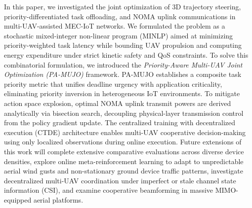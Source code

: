 \documentclass[journal]{IEEEtran}
\begin{document}
In this paper, we investigated the joint optimization of 3D trajectory steering, priority-differentiated task offloading, and NOMA uplink communications in multi-UAV-assisted MEC-IoT networks. We formulated the problem as a stochastic mixed-integer non-linear program (MINLP) aimed at minimizing priority-weighted task latency while bounding UAV propulsion and computing energy expenditure under strict kinetic safety and QoS constraints. To solve this combinatorial formulation, we introduced the \textit{Priority-Aware Multi-UAV Joint Optimization (PA-MUJO)} framework. PA-MUJO establishes a composite task priority metric that unifies deadline urgency with application criticality, eliminating priority inversion in heterogeneous IoT environments. To mitigate action space explosion, optimal NOMA uplink transmit powers are derived analytically via bisection search, decoupling physical-layer transmission control from the policy gradient update. The centralized training with decentralized execution (CTDE) architecture enables multi-UAV cooperative decision-making using only localized observations during online execution. Future extensions of this work will complete extensive comparative evaluations across diverse device densities, explore online meta-reinforcement learning to adapt to unpredictable aerial wind gusts and non-stationary ground device traffic patterns, investigate decentralized multi-UAV coordination under imperfect or stale channel state information (CSI), and examine cooperative beamforming in massive MIMO-equipped aerial platforms.




\end{document}
